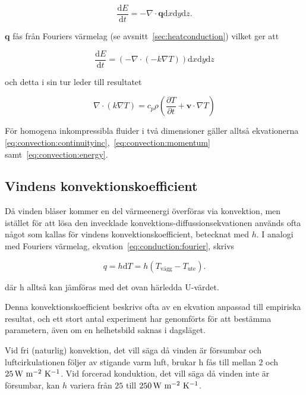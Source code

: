 \begin{equation}
\frac{\mathrm{d}E}{\mathrm{d}t} = - \nabla \cdot \mathbf{q} \mathrm{d}x\mathrm{d}y\mathrm{d}z.
\end{equation}

$\mathbf{q}$ fås från Fouriers värmelag (se avsnitt~\ref{sec:heatconduction}) vilket ger att

\begin{equation}
\label{reynoldsenergytwo}
\frac{\mathrm{d}E}{\mathrm{d}t} = \left( - \nabla \cdot \left( -k \nabla T \right) \right)\mathrm{d}x\mathrm{d}y\mathrm{d}z
\end{equation}

och detta i sin tur leder till resultatet

\begin{equation}
\label{eq:convection:energy}\boxed{ \; \; \;
\nabla \cdot \left( k \nabla T \right) = c_p \rho \left( \frac{\partial T}{\partial t} + \mathbf{v}\cdot \nabla T\right)
\; \; \;}
\end{equation}

För homogena inkompressibla fluider i två dimensioner gäller alltså ekvationerna
\eqref{eq:convection:continuityinc},~\eqref{eq:convection:momentum} samt~\eqref{eq:convection:energy}.

\subsection{Vindens konvektionskoefficient}
\label{subsec:windconv}

Då vinden blåser kommer en del värmeenergi överföras via konvektion, men istället för att lösa den invecklade konvektions-diffussionsekvationen används ofta något som kallas för vindens konvektionskoefficient, betecknat med $h$. I analogi med Fouriers värmelag, ekvation~\ref{eq:conduction:fourier}, skrivs

\begin{equation}\boxed{ \; \; \;
q = h\mathrm{d}T = h\left( T_\text{vägg} - T_\text{ute}\right).
\; \; \;}\end{equation}

där h alltså kan jämföras med det ovan härledda U-värdet. 

Denna konvektionskoefficient beskrivs ofta av en ekvation anpassad till empiriska resultat, och ett stort antal experiment har genomförts för att bestämma parametern, även om en helhetsbild saknas i dagsläget.

Vid fri (naturlig) konvektion, det vill säga då vinden är försumbar och luftcirkulationen
följer av stigande varm luft, brukar h fås till mellan $2$ och $\unit[25]{W~m^{-2}~K^{-1}}$.
Vid forcerad konduktion, det vill säga då vinden inte är försumbar,
kan $h$ variera från $25$ till $\unit[250]{W~m^{-2}~K^{-1}}$. \cite{ASHRAE09}

